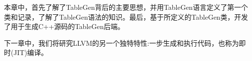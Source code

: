 
本章中，首先了解了TableGen背后的主要思想，并用TableGen语言定义了第一个类和记录，了解了TableGen语法的知识。最后，基于所定义的TableGen类，开发了用于生成C++源码的TableGen后端。

下一章中，我们将研究LLVM的另一个独特特性:一步生成和执行代码，也称为即时(JIT)编译。

